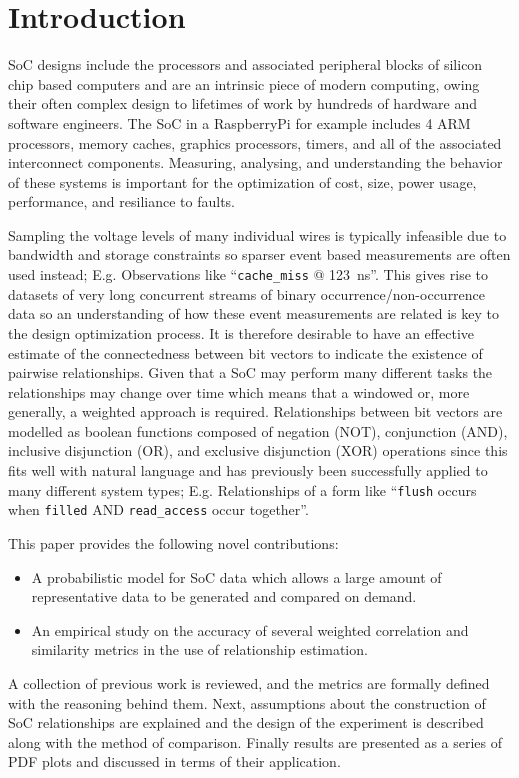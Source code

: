 \documentclass[runningheads]{llncs}
\begin{document}
\section{Introduction} %
\label{sec:introduction}

\gls{SoC} designs include the processors and associated peripheral blocks of
silicon chip based computers and are an intrinsic piece of modern computing,
owing their often complex design to lifetimes of work by hundreds of hardware
and software engineers.
The \gls{SoC} in a RaspberryPi\cite{BCM2836} for example includes 4 ARM
processors, memory caches, graphics processors, timers,
and all of the associated interconnect components.
Measuring, analysing, and understanding the behavior of these systems is
important for the optimization of cost, size, power usage, performance, and
resiliance to faults.

Sampling the voltage levels of many individual wires is typically infeasible due
to bandwidth and storage constraints so sparser event based measurements are
often used instead;
E.g. Observations like ``\texttt{cache\_miss} @ \SI{123}{\nano\second}''.
This gives rise to datasets of very long concurrent streams of binary
occurrence/non-occurrence data so an understanding of how these event
measurements are related is key to the design optimization process.
It is therefore desirable to have an effective estimate of the connectedness
between bit vectors to indicate the existence of pairwise relationships.
Given that a \gls{SoC} may perform many different tasks the relationships
may change over time which means that a windowed or, more generally,
a weighted approach is required.
Relationships between bit vectors are modelled as boolean functions composed
of negation (NOT), conjunction (AND), inclusive disjunction (OR),
and exclusive disjunction (XOR) operations since this fits well with natural
language and has previously been successfully applied to many different system
types\cite{MeasureLogicComplexity};
E.g. Relationships of a form like ``\texttt{flush} occurs when
\texttt{filled} AND \texttt{read\_access} occur together''.

This paper provides the following novel contributions:
\begin{itemize}
\item A probabilistic model for \gls{SoC} data which allows a large amount of
    representative data to be generated and compared on demand.
\item An empirical study on the accuracy of several weighted correlation and
    similarity metrics in the use of relationship estimation.
\end{itemize}
A collection of previous work is reviewed, and the metrics are formally
defined with the reasoning behind them.
Next, assumptions about the construction of \gls{SoC} relationships are
explained and the design of the experiment is described along with the method
of comparison.
Finally results are presented as a series of \gls{PDF} plots and discussed in
terms of their application.
\end{document}
